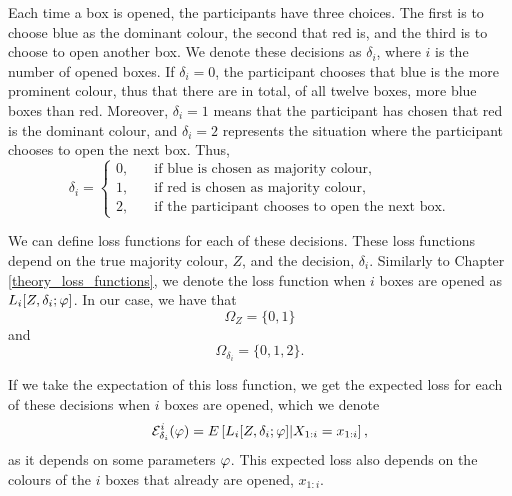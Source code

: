 
Each time a box is opened, the participants have three choices. The first is to choose blue as the dominant colour, the second that red is, and the third is to choose to open another box. We denote these decisions as $\delta_i$, where $i$ is the number of opened boxes. If $\delta_i = 0$, the participant chooses that blue is the more prominent colour, thus that there are in total, of all twelve boxes, more blue boxes than red. Moreover, $\delta_i=1$ means that the participant has chosen that red is the dominant colour, and $\delta_i=2$ represents the situation where the participant chooses to open the next box. Thus,
\begin{equation}
\label{def_of_delta}
    \delta_i =
    \begin{cases}
        0,& \quad \text{if blue is chosen as majority colour,}\\
        1,& \quad \text{if red is chosen as majority colour,}\\
        2,& \quad \text{if the participant chooses to open the next box.}
    \end{cases}
\end{equation}

We can define loss functions for each of these decisions. These loss functions depend on the true majority colour, $Z$, and the decision, $\delta_i$. Similarly to Chapter \ref{theory_loss_functions}, we denote the loss function when $i$ boxes are opened as $L_i[Z,\delta_i;\varphi]$. In our case, we have that 
\begin{equation*}
    \Omega_Z = \{0,1\}
\end{equation*}
and 
\begin{equation*}
    \Omega_{\delta_i}=\{0,1,2\}.
\end{equation*}


If we take the expectation of this loss function, we get the expected loss for each of these decisions when $i$ boxes are opened, which we denote
\begin{equation*}
    \mathcal{E}^i_{\delta_i}(\varphi) = E\left[ L_i[Z,\delta_i;\varphi]|X_{1:i}=x_{1:i}\right],
\end{equation*}
as it depends on some parameters $\varphi$. This expected loss also depends on the colours of the $i$ boxes that already are opened, $x_{1:i}$.


